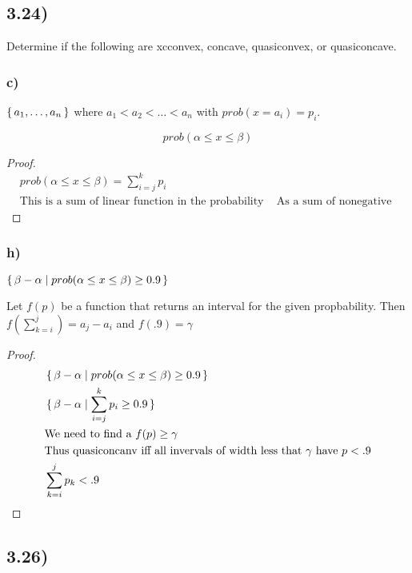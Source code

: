 \documentclass[12pt]{article}
\newenvironment{proposition}[2][Proposition]{\begin{trivlist}
\item[\hskip \labelsep {\bfseries #1}\hskip \labelsep {\bfseries #2.}]}{\end{trivlist}}
\begin{document}
\subsection*{3.24)}
Determine if the following are xcconvex, concave, quasiconvex, or quasiconcave.

\subsubsection*{c)}
$\set{a_1, \dots , a_n}$ where $a_1 < a_2 < \dots < a_n$ with $prob(x=a_i)=p_i$.

$$prob(\alpha \le x \le \beta)$$
\begin{proof}
\begin{align*}
& prob(\alpha \le x \le \beta) = \sum_{i=j}^{k}p_i\\
& \text{This is a sum of linear function in the probability space, each of which are convex and nonegative.}
& \text{As a sum of nonegative linear functions, the function is linear.}
\end{align*}
\end{proof}


\subsubsection*{h)}
$\set{\beta - \alpha | prob(\alpha \le x \le \beta) \ge 0.9}$

\begin{proposition}{}
Let $f(p)$ be a function that returns an interval for the given propbability.
Then $f(\sum_{k=i}^{j}) = a_j - a_i$ and $f(.9) = \gamma$
\end{proposition}
\begin{proof}
\begin{align*}
& \set{\beta - \alpha | prob(\alpha \le x \le \beta) \ge 0.9}\\
& \set{\beta - \alpha | \sum_{i=j}^{k}p_i \ge 0.9}\\
& \text{We need to find a $f(p) \ge \gamma$}\\
&\text{Thus quasiconcanv iff all invervals of width less that $\gamma$ have $p < .9$}\\
& \sum_{k=i}^{j}p_k < .9
\end{align*}
\end{proof}




\subsection*{3.26)}
\end{document}
